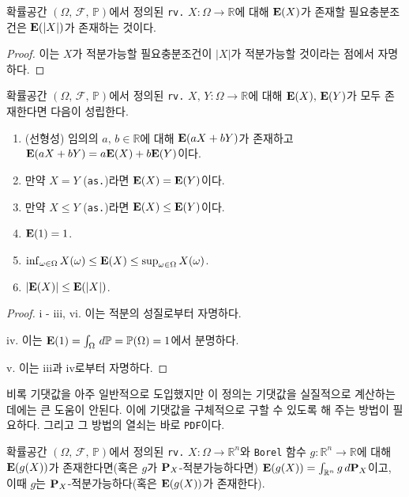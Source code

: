 \begin{proposition}
    확률공간 $(\Omega,\,\mathcal{F},\,\mathbb{P})$에서 정의된 \texttt{rv.} $X:\Omega\to\mathbb{R}$에 대해 $\mathbf{E}(X)$가 존재할 필요충분조건은 $\mathbf{E}(|X|)$가 존재하는 것이다.
\end{proposition}

\begin{proof}
    이는 $X$가 적분가능할 필요충분조건이 $|X|$가 적분가능할 것이라는 점에서 자명하다.
\end{proof}

\begin{theorem}
    확률공간 $(\Omega,\,\mathcal{F},\,\mathbb{P})$에서 정의된 \texttt{rv.} $X,\,Y:\Omega\to\mathbb{R}$에 대해 $\mathbf{E}(X),\,\mathbf{E}(Y)$가 모두 존재한다면 다음이 성립한다.
    \begin{enumerate}
        \item (선형성) 임의의 $a,\,b\in\mathbb{R}$에 대해 $\mathbf{E}(aX+bY)$가 존재하고 $\mathbf{E}(aX+bY)=a\mathbf{E}(X)+b\mathbf{E}(Y)$이다.
        \item 만약 $X=Y$ (\texttt{as.})라면 $\mathbf{E}(X)=\mathbf{E}(Y)$이다.
        \item 만약 $X\leq Y$ (\texttt{as.})라면 $\mathbf{E}(X)\leq\mathbf{E}(Y)$이다.
        \item $\mathbf{E}(1)=1$.
        \item $\inf_{\omega\in\Omega}X(\omega)\leq\mathbf{E}(X)\leq\sup_{\omega\in\Omega}X(\omega)$.
        \item $|\mathbf{E}(X)|\leq\mathbf{E}(|X|)$.
    \end{enumerate}
\end{theorem}

\begin{proof}
    i - iii, vi. 이는 적분의 성질로부터 자명하다.

    iv. 이는 $\mathbf{E}(1)=\int_\Omega\,d\mathbb{P}=\mathbb{P}(\Omega)=1$에서 분명하다.

    v. 이는 iii과 iv로부터 자명하다.
\end{proof}

비록 기댓값을 아주 일반적으로 도입했지만 이 정의는 기댓값을 실질적으로 계산하는 데에는 큰 도움이 안된다. 이에 기댓값을 구체적으로 구할 수 있도록 해 주는 방법이 필요하다. 그리고 그 방법의 열쇠는 바로 \texttt{PDF}이다.

\begin{theorem}
    확률공간 $(\Omega,\,\mathcal{F},\,\mathbb{P})$에서 정의된 \texttt{rv.} $X:\Omega\to\mathbb{R}^n$와 \texttt{Borel} 함수 $g:\mathbb{R}^n\to\mathbb{R}$에 대해 $\mathbf{E}(g(X))$가 존재한다면(혹은 $g$가 $\mathbf{P}_X$-적분가능하다면) $\mathbf{E}(g(X))=\int_{\mathbb{R}^n}g\,d\mathbf{P}_X$이고, 이때 $g$는 $\mathbf{P}_X$-적분가능하다(혹은 $\mathbf{E}(g(X))$가 존재한다).
\end{theorem}

